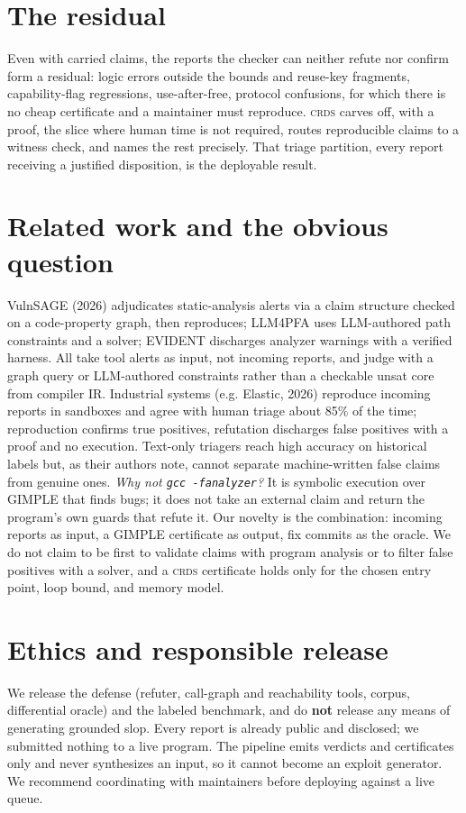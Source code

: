 \documentclass[11pt]{article}
\newcommand{\crds}{\textsc{crds}}
\begin{document}
\section{The residual}
Even with carried claims, the reports the checker can neither refute nor confirm form a residual: logic errors
outside the bounds and reuse-key fragments, capability-flag regressions, use-after-free, protocol confusions, for
which there is no cheap certificate and a maintainer must reproduce. \crds{} carves off, with a proof, the slice
where human time is not required, routes reproducible claims to a witness check, and names the rest precisely. That
triage partition, every report receiving a justified disposition, is the deployable result.

\section{Related work and the obvious question}
VulnSAGE (2026) adjudicates static-analysis alerts via a claim structure checked on a code-property graph, then
reproduces; LLM4PFA uses LLM-authored path constraints and a solver; EVIDENT discharges analyzer warnings with a
verified harness. All take tool alerts as input, not incoming reports, and judge with a graph query or LLM-authored
constraints rather than a checkable unsat core from compiler IR. Industrial systems (e.g. Elastic, 2026) reproduce
incoming reports in sandboxes and agree with human triage about 85\% of the time; reproduction confirms true
positives, refutation discharges false positives with a proof and no execution. Text-only triagers reach high
accuracy on historical labels but, as their authors note, cannot separate machine-written false claims from genuine
ones. \emph{Why not \texttt{gcc -fanalyzer}?} It is symbolic execution over GIMPLE that finds bugs; it does not take
an external claim and return the program's own guards that refute it. Our novelty is the combination: incoming
reports as input, a GIMPLE certificate as output, fix commits as the oracle. We do not claim to be first to validate
claims with program analysis or to filter false positives with a solver, and a \crds{} certificate holds only for
the chosen entry point, loop bound, and memory model.

\section{Ethics and responsible release}
We release the defense (refuter, call-graph and reachability tools, corpus, differential oracle) and the labeled
benchmark, and do \textbf{not} release any means of generating grounded slop. Every report is already public and
disclosed; we submitted nothing to a live program. The pipeline emits verdicts and certificates only and never
synthesizes an input, so it cannot become an exploit generator. We recommend coordinating with maintainers before
deploying against a live queue.
\end{document}

